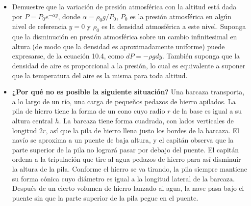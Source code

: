 \documentclass[11pt,a4paper]{article}
\begin{document}
\begin{itemize}
    \item[\textbf{49.}] Demuestre que la variación de presión atmosférica con la altitud está dada por \(P = P_0 e^{-\alpha y}\), donde \(\alpha = \rho_0 g / P_0\), \(P_0\) es la presión atmosférica en algún nivel de referencia \(y = 0\) y \(\rho_0\) es la densidad atmosférica a este nivel. Suponga que la disminución en presión atmosférica sobre un cambio infinitesimal en altura (de modo que la densidad es aproximadamente uniforme) puede expresarse, de la ecuación 10.4, como \(dP = -\rho g dy\). También suponga que la densidad de aire es proporcional a la presión, lo cual es equivalente a suponer que la temperatura del aire es la misma para toda altitud.
    \vspace*{8cm}
    
    \item[\textbf{50.}] \textbf{¿Por qué no es posible la siguiente situación?} Una barcaza transporta, a lo largo de un río, una carga de pequeños pedazos de hierro apilados. La pila de hierro tiene la forma de un cono cuyo radio \(r\) de la base es igual a su altura central \(h\). La barcaza tiene forma cuadrada, con lados verticales de longitud \(2r\), así que la pila de hierro llena justo los bordes de la barcaza. El navío se aproxima a un puente de baja altura, y el capitán observa que la parte superior de la pila no logrará pasar por debajo del puente. El capitán ordena a la tripulación que tire al agua pedazos de hierro para así disminuir la altura de la pila. Conforme el hierro se va tirando, la pila siempre mantiene su forma cónica cuyo diámetro es igual a la longitud lateral de la barcaza. Después de un cierto volumen de hierro lanzado al agua, la nave pasa bajo el puente sin que la parte superior de la pila pegue en el puente.
    \vspace*{8cm}
\end{itemize}
\end{document}
